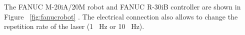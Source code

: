 The  FANUC M-20iA/20M robot and FANUC R-30iB controller are shown in Figure~ \ref{fig:fanucrobot} \cite{fanucrobotcontroller}. The electrical connection also allows to change the repetition rate of the laser (1 \SI{}{\hertz} or 10 \SI{}{\hertz}).


